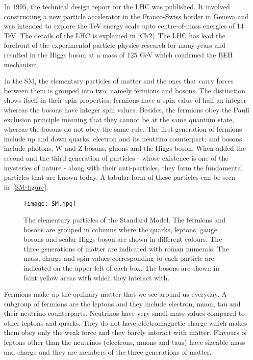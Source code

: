 In 1995, the technical design report for the LHC was published\cite{lhc-tdr}. It involved constructing a new particle accelerator in the Franco-Swiss border in Geneva and was intended to explore the TeV energy scale upto centre-of-mass energies of 14 TeV. The details of the LHC is explained in \autoref{Ch2}. The LHC has lead the forefront of the experimental particle physics research for many years and resulted in the Higgs boson at a mass of 125 GeV which confirmed the BEH mechanism.

In the SM, the elementary particles of matter and the ones that carry forces between them is grouped into two, namely fermions and bosons. The distinction shows itself in their spin properties; fermions have a spin value of half an integer whereas the bosons have integer spin values. Besides, the fermions obey the Pauli exclusion principle meaning that they cannot be at the same quantum state, whereas the bosons do not obey the same rule. The first generation of fermions include up and down quarks, electron and its neutrino counterpart; and bosons include photons, W and Z bosons, gluons and the Higgs boson. When added the second and the third generation of particles - whose existence is one of the mysteries of nature - along with their anti-particles, they form the fundamental particles that are known today. A tabular form of these particles can be seen in~\autoref{SM-figure}.

\vspace{6pt}
\begin{figure}[ht]
	\centering
	\texttt{[image: SM.jpg]}
	\vspace{-0.5cm}
	\vspace{6pt}
	\caption{The elementary particles of the Standard Model. The fermions and bosons are grouped in columns where the quarks, leptons, gauge bosons and scalar Higgs boson are shown in different colours. The three generations of matter are indicated with roman numerals. The mass, charge and spin values corresponding to each particle are indicated on the upper left of each box. The bosons are shown in faint yellow areas with which they interact with.}
	\label{SM-figure}
\end{figure}

Fermions make up the ordinary matter that we see around us everyday. A subgroup of fermions are the leptons and they include electron, muon, tau and their neutrino counterparts. Neutrinos have very small mass values compared to other leptons and quarks. They do not have electromagnetic charge which makes them obey only the weak force and they barely interact with matter. Flavours of leptons other than the neutrinos (electrons, muons and taus) have sizeable mass and charge and they are members of the three generations of matter.

